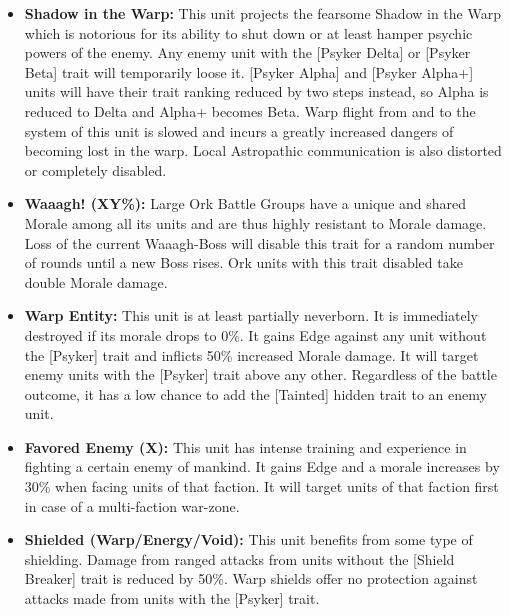 \begin{itemize}
 	\item \textbf{Shadow in the Warp:} This unit projects the fearsome Shadow in the Warp which is notorious for its ability to shut down or at least hamper psychic powers of the enemy. Any enemy unit with the [Psyker Delta] or [Psyker Beta] trait will temporarily loose it. [Psyker Alpha] and [Psyker Alpha+] units will have their trait ranking reduced by two steps instead, so Alpha is reduced to Delta and Alpha+ becomes Beta. Warp flight from and to the system of this unit is slowed and incurs a greatly increased dangers of becoming lost in the warp. Local Astropathic communication is also distorted or completely disabled.
 	\item \textbf{Waaagh! (XY\%):} Large Ork Battle Groups have a unique and shared Morale among all its units and are thus highly resistant to Morale damage. Loss of the current Waaagh-Boss will disable this trait for a random number of rounds until a new Boss rises. Ork units with this trait disabled take double Morale damage.
 	\item \textbf{Warp Entity:} This unit is at least partially neverborn. It is immediately destroyed if its morale drops to 0\%. It gains Edge against any unit without the [Psyker] trait and inflicts 50\% increased Morale damage. It will target enemy units with the [Psyker] trait above any other. Regardless of the battle outcome, it has a low chance to add the [Tainted] hidden trait to an enemy unit.
 	\item \textbf{Favored Enemy (X):} This unit has intense training and experience in fighting a certain enemy of mankind. It gains Edge and a morale increases by 30\% when facing units of that faction. It will target units of that faction first in case of a multi-faction war-zone.
 	\item \textbf{Shielded (Warp/Energy/Void):} This unit benefits from some type of shielding. Damage from ranged attacks from units without the [Shield Breaker] trait is reduced by 50\%. Warp shields offer no protection against attacks made from units with the [Psyker] trait.
\end{itemize}

